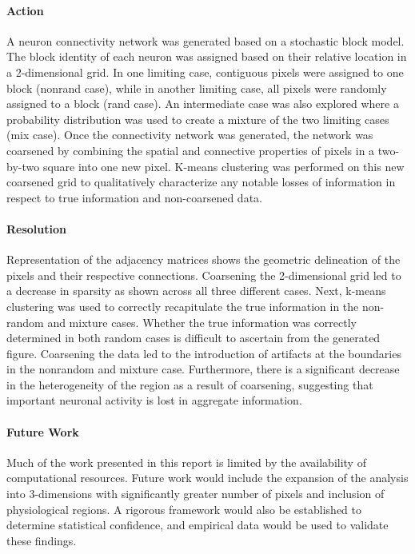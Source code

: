 \documentclass[12pt]{article}
\begin{document}
\paragraph{Action}
A neuron connectivity network was generated based on a stochastic block model.
The block identity of each neuron was assigned based on their relative location
in a 2-dimensional grid. In one limiting case, contiguous pixels were assigned
to one block (nonrand case), while in another limiting case, all pixels were
randomly assigned to a block (rand case). An intermediate case was also
explored where a probability distribution was used to create a mixture of the
two limiting cases (mix case).  Once the connectivity network was generated,
the network was coarsened by combining the spatial and connective properties of
pixels in a two-by-two square into one new pixel. K-means clustering was
performed on this new coarsened grid to qualitatively characterize any notable
losses of information in respect to true information and non-coarsened data.

\paragraph{Resolution}
Representation of the adjacency matrices shows the geometric delineation of the
pixels and their respective connections. Coarsening the 2-dimensional grid led
to a decrease in sparsity as shown across all three different cases.  Next,
k-means clustering was used to correctly recapitulate the true information in
the non-random and mixture cases. Whether the true information was correctly
determined in both random cases is difficult to ascertain from the generated
figure. Coarsening the data led to the introduction of artifacts at the
boundaries in the nonrandom and mixture case. Furthermore, there is a
significant decrease in the heterogeneity of the region as a result of
coarsening, suggesting that important neuronal activity is lost in aggregate
information.

\paragraph{Future Work}
Much of the work presented in this report is limited by the availability of
computational resources. Future work would include the expansion of the
analysis into 3-dimensions with significantly greater number of pixels and
inclusion of physiological regions. A rigorous framework would also be
established to determine statistical confidence, and empirical data would be
used to validate these findings.
\end{document}
